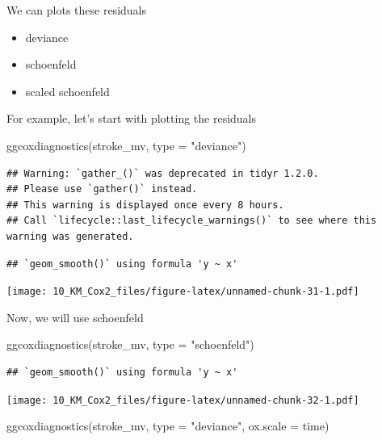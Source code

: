 \documentclass[
  10pt,
]{krantz}
\newenvironment{Shaded}{\begin{snugshade}}{\end{snugshade}}
\newcommand{\AttributeTok}[1]{\textcolor[rgb]{0.77,0.63,0.00}{#1}}
\newcommand{\FunctionTok}[1]{\textcolor[rgb]{0.00,0.00,0.00}{#1}}
\newcommand{\NormalTok}[1]{#1}
\newcommand{\StringTok}[1]{\textcolor[rgb]{0.31,0.60,0.02}{#1}}
\providecommand{\tightlist}{%
  \setlength{\itemsep}{0pt}\setlength{\parskip}{0pt}}
\begin{document}
We can plots these residuals

\begin{itemize}
\tightlist
\item
  deviance
\item
  schoenfeld
\item
  scaled schoenfeld
\end{itemize}

For example, let's start with plotting the residuals

\begin{Shaded}
\begin{Highlighting}[]
\FunctionTok{ggcoxdiagnostics}\NormalTok{(stroke\_mv, }\AttributeTok{type =} \StringTok{"deviance"}\NormalTok{)}
\end{Highlighting}
\end{Shaded}

\begin{verbatim}
## Warning: `gather_()` was deprecated in tidyr 1.2.0.
## Please use `gather()` instead.
## This warning is displayed once every 8 hours.
## Call `lifecycle::last_lifecycle_warnings()` to see where this warning was generated.
\end{verbatim}

\begin{verbatim}
## `geom_smooth()` using formula 'y ~ x'
\end{verbatim}

\texttt{[image: 10\_KM\_Cox2\_files/figure-latex/unnamed-chunk-31-1.pdf]}

Now, we will use schoenfeld

\begin{Shaded}
\begin{Highlighting}[]
\FunctionTok{ggcoxdiagnostics}\NormalTok{(stroke\_mv, }\AttributeTok{type =} \StringTok{"schoenfeld"}\NormalTok{)}
\end{Highlighting}
\end{Shaded}

\begin{verbatim}
## `geom_smooth()` using formula 'y ~ x'
\end{verbatim}

\texttt{[image: 10\_KM\_Cox2\_files/figure-latex/unnamed-chunk-32-1.pdf]}

\begin{Shaded}
\begin{Highlighting}[]
\FunctionTok{ggcoxdiagnostics}\NormalTok{(stroke\_mv, }\AttributeTok{type =} \StringTok{"deviance"}\NormalTok{, }\AttributeTok{ox.scale =} \StringTok{\textquotesingle{}time\textquotesingle{}}\NormalTok{)}
\end{Highlighting}
\end{Shaded}
\end{document}
